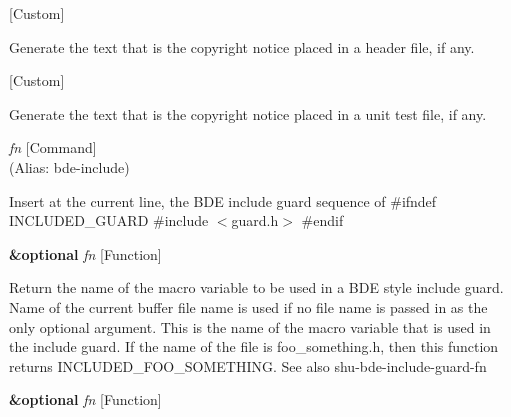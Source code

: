 \vspace{1em}
\noindent
{}
\usebox{\funcname}
 \hfill [Custom]

\begin{doc-string}
Generate the text that is the copyright notice placed in a header file,
if any.
\end{doc-string}

\vspace{1em}
\noindent
{}
\usebox{\funcname}
 \hfill [Custom]

\begin{doc-string}
Generate the text that is the copyright notice placed in a unit test
file, if any.
\end{doc-string}

\vspace{1em}
\noindent
{}
\usebox{\funcname}\emph{fn}
 \hfill [Command]\\%
 (Alias: bde-include)

\begin{doc-string}
Insert at the current line, the BDE include guard sequence of
\#ifndef INCLUDED\_GUARD
\#include $<$guard.h$>$
\#endif
\end{doc-string}

\vspace{1em}
\noindent
{}
\usebox{\funcname}\textbf{\&optional} \emph{fn}
 \hfill [Function]

\begin{doc-string}
Return the name of the macro variable to be used in a BDE style include guard.
Name of the current buffer file name is used if no file name is passed in as the
only optional argument.  This is the name of the macro variable that is used in the
include guard.  If the name of the file is foo\_something.h, then this function
returns INCLUDED\_FOO\_SOMETHING.  See also shu-bde-include-guard-fn
\end{doc-string}

\vspace{1em}
\noindent
{}
\usebox{\funcname}\textbf{\&optional} \emph{fn}
 \hfill [Function]

